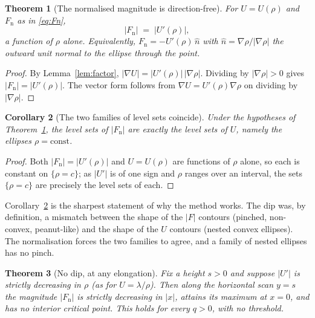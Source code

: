 \documentclass[11pt]{article}
\newtheorem{theorem}{Theorem}
\newtheorem{corollary}[theorem]{Corollary}
\theoremstyle{remark}
\begin{document}
\begin{theorem}[The normalised magnitude is direction-free]
\label{thm:magnitude}
For $U=U(\rho)$ and $F_{\mathrm{n}}$ as in \eqref{eq:Fn},
\begin{equation}
  \bigl|F_{\mathrm{n}}\bigr| \;=\; \bigl|U'(\rho)\bigr| ,
\end{equation}
a function of $\rho$ alone. Equivalently, $F_{\mathrm{n}}=-U'(\rho)\,\hat n$
with $\hat n=\nabla\rho/|\nabla\rho|$ the outward unit normal to the ellipse
through the point.
\end{theorem}

\begin{proof}
By Lemma~\ref{lem:factor}, $|\nabla U|=|U'(\rho)|\,|\nabla\rho|$. Dividing by
$|\nabla\rho|>0$ gives $|F_{\mathrm{n}}|=|U'(\rho)|$. The vector form follows
from $\nabla U=U'(\rho)\nabla\rho$ on dividing by $|\nabla\rho|$.
\end{proof}

\begin{corollary}[The two families of level sets coincide]
\label{cor:levelsets}
Under the hypotheses of Theorem~\ref{thm:magnitude}, the level sets of
$|F_{\mathrm{n}}|$ are exactly the level sets of $U$, namely the ellipses
$\rho=\text{const}$.
\end{corollary}

\begin{proof}
Both $|F_{\mathrm{n}}|=|U'(\rho)|$ and $U=U(\rho)$ are functions of $\rho$
alone, so each is constant on $\{\rho=c\}$; as $|U'|$ is of one sign and
$\rho$ ranges over an interval, the sets $\{\rho=c\}$ are precisely the level
sets of each.
\end{proof}

Corollary~\ref{cor:levelsets} is the sharpest statement of why the method
works. The dip was, by definition, a mismatch between the shape of the
$|F|$ contours (pinched, non-convex, peanut-like) and the shape of the $U$
contours (nested convex ellipses). The normalisation forces the two families
to agree, and a family of nested ellipses has no pinch.

\begin{theorem}[No dip, at any elongation]
\label{thm:nodip}
Fix a height $s>0$ and suppose $|U'|$ is strictly decreasing in $\rho$
(as for $U=\lambda/\rho$). Then along the horizontal scan $y=s$ the magnitude
$|F_{\mathrm{n}}|$ is strictly decreasing in $|x|$, attains its maximum at
$x=0$, and has no interior critical point. This holds for every $q>0$, with
no threshold.
\end{theorem}
\end{document}
